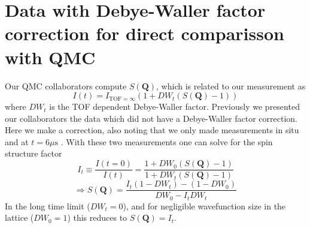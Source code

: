 \documentclass[11pt,letter]{article}
\newcommand{\bv}[1]{\ensuremath{\bm{#1}}}
\begin{document}
\section{Data with Debye-Waller factor correction for direct comparisson with QMC} 
Our QMC collaborators compute $S(\bv{Q})$, which is related to our measurement as 
\begin{equation}
 I(t) = I_{\mathrm{TOF}=\infty}( 1 +  DW_{t}( S(\bv{Q}) - 1 ) )
\end{equation}
where $DW_{t}$ is the TOF dependent Debye-Waller factor.
 Previously
we presented our collaborators the data  which did not have a Debye-Waller
factor correction.   Here we make a correction, also noting that we only made
measurements in situ and at $t=6\mu\mathrm{s}$ .   With these two measurements one can
solve for the spin structure factor 
\begin{equation}
 I_{t} \equiv \frac{ I(t=0)}{I(t)} = \frac{ 1 + DW_{0}(S(\bv{Q})-1) }{ 1 + DW_{t}(S(\bv{Q})-1)} 
\end{equation}
\begin{equation}
\Rightarrow S(\bv{Q}) = \frac{  I_{t}(1-DW_{t}) - (1-DW_{0})}{ DW_{0} - I_{t}DW_{t} } 
\end{equation}
In the long time limit ($DW_{t}=0$), and for negligible wavefunction size in the lattice ($DW_{0}=1$) this reduces to $S(\bv{Q})=I_{t}$. 
\end{document}
